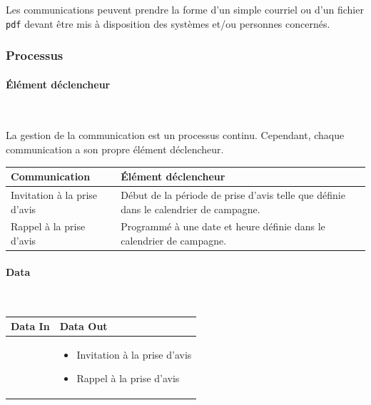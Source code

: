 \documentclass[a4paper,11pt]{report}
\begin{document}
Les communications peuvent prendre la forme d'un simple courriel ou d'un fichier \texttt{pdf} devant être mis à disposition des systèmes et/ou personnes concernés.


\subsubsection{Processus}
\paragraph{Élément déclencheur}~\newline{}

La gestion de la communication est un processus continu.
Cependant, chaque communication a son propre élément déclencheur.\newline{}

\begin{tabularx}{\linewidth}{|l|X|} \hline
Communication & Élément déclencheur \\ \hline
Invitation à la prise d'avis & Début de la période de prise d'avis telle que définie dans le calendrier de campagne. \\
Rappel à la prise d'avis & Programmé à une date et heure définie dans le calendrier de campagne. \\ \hline
\end{tabularx}



\paragraph{Data}~\newline{}

\begin{tabularx}{\linewidth}{|X|X|} \hline
Data In & Data Out \\ \hline
 & 
\begin{itemize}
	\item Invitation à la prise d'avis
	\item Rappel à la prise d'avis\newline{}
\end{itemize}
\\ \hline
\end{tabularx}
\end{document}
